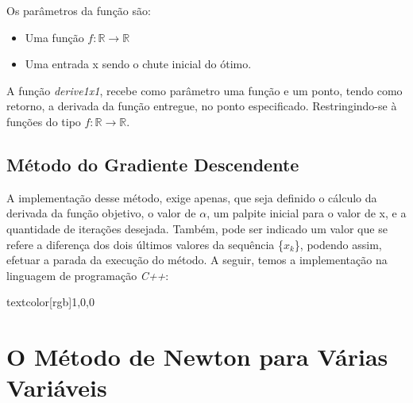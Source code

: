 Os parâmetros da função são:

    \begin{itemize}
            \item Uma função \(f : \mathbb{R} \rightarrow \mathbb{R}\)
            \item Uma entrada x sendo o chute inicial do ótimo.
    \end{itemize}


A função \textit{derive1x1}, recebe como parâmetro uma função e um ponto,
tendo como retorno, a derivada da função entregue, no ponto especificado.
Restringindo-se à funções do tipo \(f : \mathbb{R} \rightarrow \mathbb{R}\).


\subsection{Método do Gradiente Descendente}

\hspace{0.8cm}
A implementação desse método, exige apenas, que seja definido o cálculo
da derivada da função objetivo, o valor de $\alpha$, um palpite inicial para
o valor de x, e a quantidade de iterações desejada. Também, pode ser
indicado um valor que se refere a diferença dos dois últimos valores
da sequência \{$x_k$\}, podendo assim, efetuar a parada da execução do
método. A seguir, temos a implementação na linguagem de programação
\textit{C++}:

\vspace{0.2cm}





textcolor[rgb]{1,0,0}{\section{{O Método de Newton para Várias Variáveis}}}

